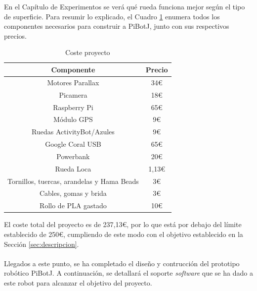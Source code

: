 En el Capítulo de Experimentos se verá qué rueda funciona mejor según el tipo de superficie. Para resumir lo explicado, el Cuadro \ref{cuadro:costetotal} enumera todos los componentes necesarios para construir a PiBotJ, junto con sus respectivos precios.

\begin{table}[H]
	\begin{center}
		\begin{tabular}{|c|c|}
			\hline
			Componente & Precio \\
			\hline
			Motores Parallax & 34€ \\
			\hline
			Picamera &  18€ \\
			\hline
			Raspberry Pi & 65€ \\
			\hline
			Módulo GPS & 9€ \\
			\hline
			Ruedas ActivityBot/Azules & 9€ \\
			\hline
			Google Coral USB & 65€ \\
			\hline
			Powerbank & 20€ \\
			\hline
			Rueda Loca & 1,13€ \\
			\hline
			Tornillos, tuercas, arandelas y Hama Beads & 3€ \\
			\hline
			Cables, gomas y brida & 3€ \\
			\hline
			Rollo de PLA gastado & 10€ \\
			\hline
		\end{tabular}
		\caption{Coste proyecto}
		\label{cuadro:costetotal}
	\end{center}
\end{table}

El coste total del proyecto es de 237,13€, por lo que está por debajo del límite establecido de 250€, cumpliendo de este modo con el objetivo establecido en la Sección \ref{sec:descripcion}.\\\\



Llegados a este punto, se ha completado el diseño y contrucción del prototipo robótico PiBotJ. A continuación, se detallará el soporte \textit{software} que se ha dado a este robot para alcanzar el objetivo del proyecto.

